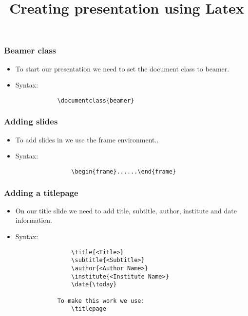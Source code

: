 \documentclass{beamer}
\title{Creating presentation using \textbf{Latex}}
\begin{document}
	\begin{frame}
		\maketitle
	\end{frame}
	\begin{frame}[fragile]
		\frametitle{Beamer class}
		\begin{Large}		
		\begin{itemize}
			\item To start our presentation we need to set the document class to beamer.
			\item Syntax:\\\Large
			\begin{verbatim}
			\documentclass{beamer}
			\end{verbatim}
		\end{itemize}
		\end{Large}
	\end{frame}
	\begin{frame}[fragile]
		\frametitle{Adding slides}
		\begin{Large}		
		\begin{itemize}
			\item To add slides in we use the frame environment..
			\item Syntax:\\\Large
			\begin{verbatim}
				\begin{frame}......\end{frame}
			\end{verbatim}
		\end{itemize}
		\end{Large}
	\end{frame}	
	\begin{frame}[fragile]
		\frametitle{Adding a titlepage}
		\begin{Large}		
		\begin{itemize}
			\item On our title slide we need to add title, subtitle, author, institute and date information.
			\item Syntax:\\\Large
			\begin{verbatim}
				\title{<Title>}
				\subtitle{<Subtitle>}
				\author{<Author Name>}
				\institute{<Institute Name>}
				\date{\today}
			
			To make this work we use:
				\titlepage
			\end{verbatim}
		\end{itemize}
		\end{Large}
	\end{frame}
\end{document}

